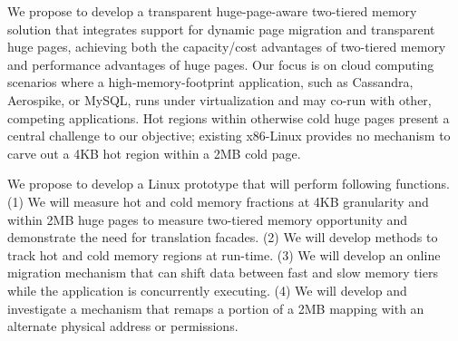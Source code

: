 We propose to develop a transparent huge-page-aware two-tiered
memory solution that integrates support for dynamic page migration and
transparent huge pages, achieving both the capacity/cost advantages of
two-tiered memory and performance advantages of huge pages.  Our focus is on
cloud computing scenarios where a high-memory-footprint application, such as
Cassandra, Aerospike, or MySQL, runs under virtualization and may co-run with
other, competing applications.
Hot regions within otherwise cold huge pages present a central challenge to our
objective; existing x86-Linux provides no mechanism to carve out a 4KB hot
region within a 2MB cold page.


We propose to develop a Linux prototype that will perform following functions.
(1) We will measure hot
and cold memory fractions at 4KB granularity and within 2MB huge pages to
measure two-tiered memory opportunity and demonstrate the need for translation
facades.
(2) We will develop methods to track hot and cold memory
regions at run-time. 
(3) We will develop an online migration mechanism that can shift
data between fast and slow memory tiers while the application is concurrently
executing.
(4) We will develop and investigate a mechanism that remaps a portion of a
2MB mapping with an alternate physical address or permissions.  

